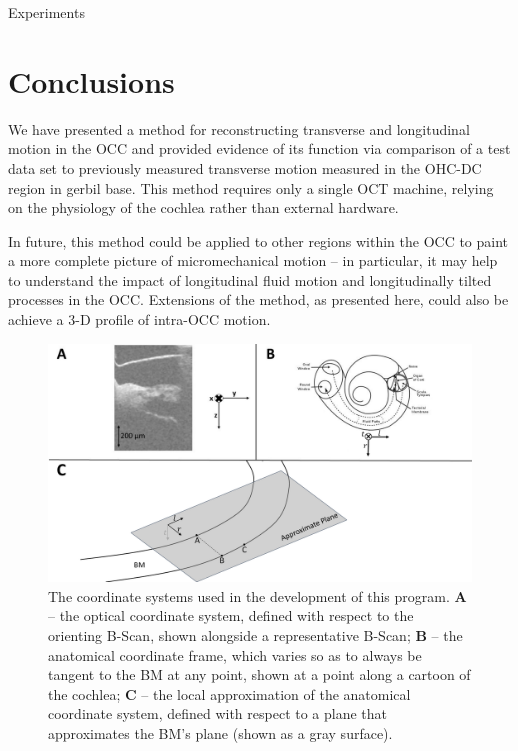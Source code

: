 \documentclass[preprint,NumberedRefs]{JASA}
\begin{document}
\par{Experiments}

\section{Conclusions}
\par{We have presented a method for reconstructing transverse and longitudinal motion in the OCC and provided evidence of its function via comparison of a test data set to previously measured transverse motion measured in the OHC-DC region in gerbil base. This method requires only a single OCT machine, relying on the physiology of the cochlea rather than external hardware.}
\par{In future, this method could be applied to other regions within the OCC to paint a more complete picture of micromechanical motion -- in particular, it may help to understand the impact of longitudinal fluid motion and longitudinally tilted processes in the OCC. Extensions of the method, as presented here, could also be achieve a 3-D profile of intra-OCC motion.} 


\begin{figure}[h!]
\centering
\includegraphics[width=\textwidth]{Figure2.pdf}
\caption{The coordinate systems used in the development of this program. \textbf{A} -- the optical coordinate system, defined with respect to the orienting B-Scan, shown alongside a representative B-Scan; \textbf{B} -- the anatomical coordinate frame, which varies so as to always be tangent to the BM at any point, shown at a point along a cartoon of the cochlea; \textbf{C} -- the local approximation of the anatomical coordinate system, defined with respect to a plane that approximates the BM's plane (shown as a gray surface).}
\label{coords}
\end{figure}

\clearpage

\end{document}
